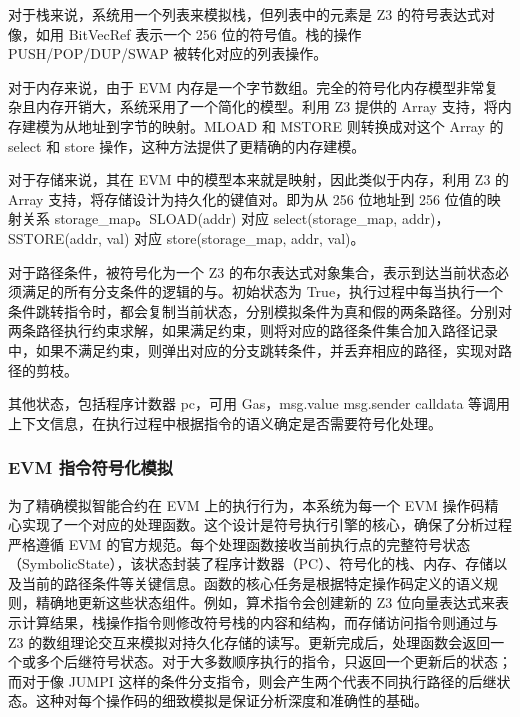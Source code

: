 \documentclass[print, master, vlined, timesmath]{DissertUESTC}
\begin{document}
对于栈来说，系统用一个列表来模拟栈，但列表中的元素是 Z3 的符号表达式对像，如用 BitVecRef 表示一个 256 位的符号值。栈的操作 PUSH/POP/DUP/SWAP 被转化对应的列表操作。

对于内存来说，由于 EVM 内存是一个字节数组。完全的符号化内存模型非常复杂且内存开销大，系统采用了一个简化的模型。利用 Z3 提供的 Array 支持，将内存建模为从地址到字节的映射。MLOAD 和 MSTORE 则转换成对这个 Array 的 select 和 store 操作，这种方法提供了更精确的内存建模。

对于存储来说，其在 EVM 中的模型本来就是映射，因此类似于内存，利用 Z3 的 Array 支持，将存储设计为持久化的键值对。即为从 256 位地址到 256 位值的映射关系 storage\_map。SLOAD(addr) 对应 select(storage\_map, addr)，SSTORE(addr, val) 对应 store(storage\_map, addr, val)。

对于路径条件，被符号化为一个 Z3 的布尔表达式对象集合，表示到达当前状态必须满足的所有分支条件的逻辑的与。初始状态为 True，执行过程中每当执行一个条件跳转指令时，都会复制当前状态，分别模拟条件为真和假的两条路径。分别对两条路径执行约束求解，如果满足约束，则将对应的路径条件集合加入路径记录中，如果不满足约束，则弹出对应的分支跳转条件，并丢弃相应的路径，实现对路径的剪枝。

其他状态，包括程序计数器 pc，可用 Gas，msg.value msg.sender calldata 等调用上下文信息，在执行过程中根据指令的语义确定是否需要符号化处理。

\subsubsection{EVM 指令符号化模拟}

为了精确模拟智能合约在 EVM 上的执行行为，本系统为每一个 EVM 操作码精心实现了一个对应的处理函数。这个设计是符号执行引擎的核心，确保了分析过程严格遵循 EVM 的官方规范。每个处理函数接收当前执行点的完整符号状态（SymbolicState），该状态封装了程序计数器（PC）、符号化的栈、内存、存储以及当前的路径条件等关键信息。函数的核心任务是根据特定操作码定义的语义规则，精确地更新这些状态组件。例如，算术指令会创建新的 Z3 位向量表达式来表示计算结果，栈操作指令则修改符号栈的内容和结构，而存储访问指令则通过与 Z3 的数组理论交互来模拟对持久化存储的读写。更新完成后，处理函数会返回一个或多个后继符号状态。对于大多数顺序执行的指令，只返回一个更新后的状态；而对于像 JUMPI 这样的条件分支指令，则会产生两个代表不同执行路径的后继状态。这种对每个操作码的细致模拟是保证分析深度和准确性的基础。
\end{document}
